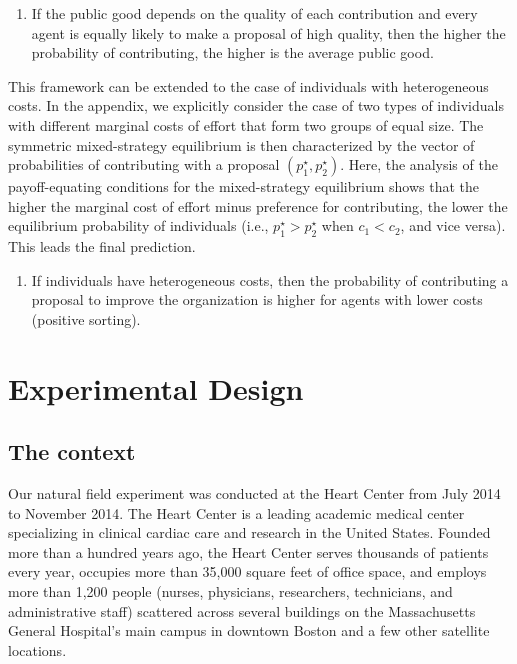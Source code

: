 \documentclass[11pt, titlepage]{article}
\providecommand{\tightlist}{%
  \setlength{\itemsep}{0pt}\setlength{\parskip}{0pt}}
\begin{document}
\begin{enumerate}
\def\labelenumi{\arabic{enumi})}
\setcounter{enumi}{3}
\tightlist
\item
  If the public good depends on the quality of each contribution and
  every agent is equally likely to make a proposal of high quality, then
  the higher the probability of contributing, the higher is the average
  public good.
\end{enumerate}

This framework can be extended to the case of individuals with
heterogeneous costs. In the appendix, we explicitly consider the case of
two types of individuals with different marginal costs of effort that
form two groups of equal size. The symmetric mixed-strategy equilibrium
is then characterized by the vector of probabilities of contributing
with a proposal \((p_1^\star, p_2^\star)\). Here, the analysis of the
payoff-equating conditions for the mixed-strategy equilibrium shows that
the higher the marginal cost of effort minus preference for
contributing, the lower the equilibrium probability of individuals
(i.e., \(p_1^\star > p_2^\star\) when \(c_1 < c_2\), and vice versa).
This leads the final prediction.

\begin{enumerate}
\def\labelenumi{\arabic{enumi})}
\setcounter{enumi}{4}
\tightlist
\item
  If individuals have heterogeneous costs, then the probability of
  contributing a proposal to improve the organization is higher for
  agents with lower costs (positive sorting).
\end{enumerate}

\section{Experimental Design}\label{experimental-design}

\subsection{The context}\label{the-context}

Our natural field experiment was conducted at the Heart Center from July
2014 to November 2014. The Heart Center is a leading academic medical
center specializing in clinical cardiac care and research in the United
States. Founded more than a hundred years ago, the Heart Center serves
thousands of patients every year, occupies more than 35,000 square feet
of office space, and employs more than 1,200 people (nurses, physicians,
researchers, technicians, and administrative staff) scattered across
several buildings on the Massachusetts General Hospital's main campus in
downtown Boston and a few other satellite locations.
\end{document}

